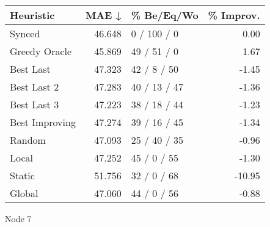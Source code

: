 \begin{tabular}{lrlr}
\toprule
\textbf{Heuristic} & \textbf{MAE ↓} & \textbf{\% Be/Eq/Wo} & \textbf{\% Improv.} \\
\midrule
            Synced &         46.648 &          0 / 100 / 0 &                0.00 \\
     Greedy Oracle &         45.869 &          49 / 51 / 0 &                1.67 \\
         Best Last &         47.323 &          42 / 8 / 50 &               -1.45 \\
       Best Last 2 &         47.283 &         40 / 13 / 47 &               -1.36 \\
       Best Last 3 &         47.223 &         38 / 18 / 44 &               -1.23 \\
    Best Improving &         47.274 &         39 / 16 / 45 &               -1.34 \\
            Random &         47.093 &         25 / 40 / 35 &               -0.96 \\
             Local &         47.252 &          45 / 0 / 55 &               -1.30 \\
            Static &         51.756 &          32 / 0 / 68 &              -10.95 \\
            Global &         47.060 &          44 / 0 / 56 &               -0.88 \\
\bottomrule
\end{tabular}
\caption{Node 7}
\label{tab:iid_lr05_le2_bs2_7}
